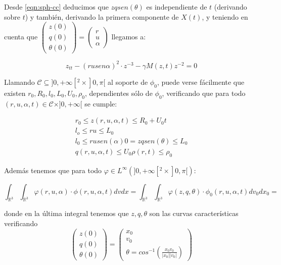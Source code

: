 \documentclass[a4paper,10pt]{scrartcl}
\theoremstyle{definition}
\numberwithin{equation}{section}
\begin{document}
Desde \eqref{eqn:sph-cc} deducimos que $zqsen(\theta)$ es independiente de $t$ (derivando sobre $t$) y también, derivando la primera componente de $X(t)$, y teniendo en cuenta que $\left(\begin{array}{c} z(0)\\ q(0)\\ \theta(0) \end{array}\right) = 
\left(\begin{array}{c} r\\ u\\ \alpha\end{array}\right)$ llegamos a:

\begin{equation}
\label{eqn:curves}
 z_{tt} - (ru sen\alpha)^2 \cdot z^{-3} - \gamma M(z,t) z^{-2} = 0
\end{equation}

Llamando $\mathcal{C} \subseteq ]0, +\infty[^2 \times ]0, \pi[$ al soporte de $\phi_0$, puede verse fácilmente que existen $r_0, R_0, l_0, L_0, U_0, \rho_0$, dependientes sólo de $\phi_0$, verificando que para todo $(r,u,\alpha,t) \in \mathcal{C} \times ]0, +\infty[$ se cumple:

\begin{align*}
 r_0 \le z(r,u,\alpha,t) \le R_0 + U_0 t\\
 l_o \le ru \le L_0\\
 l_0 \le ru sen(\alpha) 0 = zq sen(\theta) \le L_0\\
 q(r,u,\alpha, t) \le U_0
 \rho(r,t) \le \rho_0
\end{align*}

Además tenemos que para todo $\varphi \in L^{\infty}(]0,+\infty[^2 \times ]0,\pi[)$:

\[
    \int_{\mathbb{R}^3}\int_{\mathbb{R}^3} \varphi(r,u,\alpha) \cdot \phi(r,u,\alpha,t) dv dx = 
    \int_{\mathbb{R}^3}\int_{\mathbb{R}^3} \varphi(z,q,\theta) \cdot \phi_0(r,u,\alpha,t) dv_0 dx_0 = 
\]

donde en la última integral tenemos que $z,q,\theta$ son las curvas características verificando 
\[
    \left(\begin{array}{c} z(0)\\ q(0)\\ \theta(0) \end{array}\right) = 
    \left(\begin{array}{c} x_0\\ v_0\\ \theta=cos^{-1}\left(\frac{x_0 v_0}{|x_0||v_0|}\right) \end{array}\right)
\]
\end{document}
